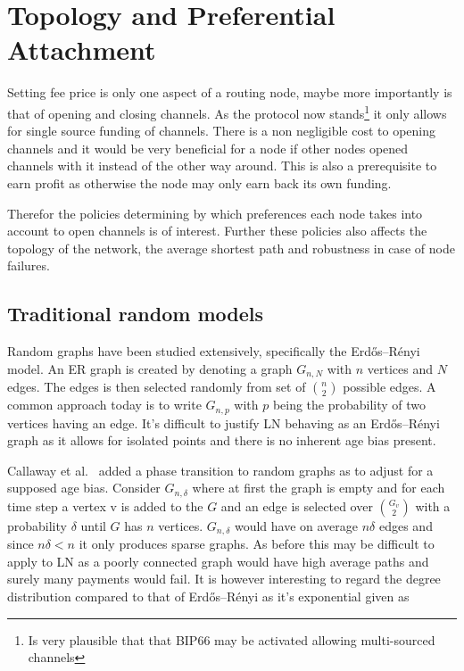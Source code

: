  

\section{Topology and Preferential Attachment}

Setting fee price is only one aspect of a routing node, maybe more importantly is that of opening and closing channels.
As the protocol now stands\footnote{Is very plausible that that BIP66 may be activated allowing multi-sourced channels\cite{bip:0118:sighash:noinput}} it only allows for single source funding of channels. There is a non negligible cost to opening channels and it would be very beneficial for a node if other nodes opened channels with it instead of the other way around. This is also a prerequisite to earn profit as otherwise the node may only earn back its own funding. 

Therefor the policies determining by which preferences each node takes into account to open channels is of interest. Further these policies also affects the topology of the network, the average shortest path and robustness in case of node failures.

\subsection{Traditional random models}

Random graphs have been studied extensively, specifically the Erdős–Rényi model\cite{erdos:renyi:random:graphs}. An ER graph is created by denoting a graph $G_{n,N}$ with $n$ vertices and $N$ edges. The edges is then selected randomly from set of ${n \choose 2}$ possible edges. A common approach today is to write $G_{n,p}$ with $p$ being the probability of two vertices having an edge. It's difficult to justify LN behaving as an Erdős–Rényi graph as it allows for isolated points and there is no inherent age bias present. 

Callaway et al.~\cite{callaway:hopcraft:randomly:grown:graphs} added a phase transition to random graphs as to adjust for a supposed age bias. Consider $G_{n,\delta}$ where at first the graph is empty and for each time step a vertex v is added to the $G$ and an edge is selected over $G_v \choose 2$ with a probability $\delta$ until $G$ has $n$ vertices. $G_{n,\delta}$ would have on average $n\delta$ edges and since $n\delta < n$ it only produces sparse graphs. As before this may be difficult to apply to LN as a poorly connected graph would have high average paths and surely many payments would fail. It is however interesting to regard the degree distribution compared to that of Erdős–Rényi as it's exponential given as


